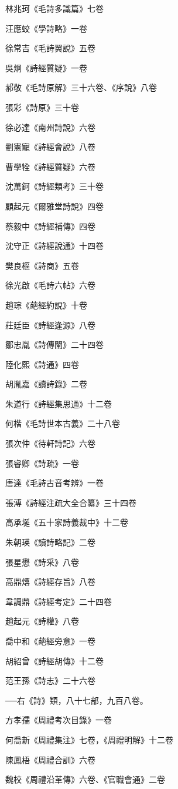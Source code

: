 林兆珂《毛詩多識篇》七卷

汪應蛟《學詩略》一卷

徐常吉《毛詩翼說》五卷

吳炯《詩經質疑》一卷

郝敬《毛詩原解》三十六卷、《序說》八卷

張彩《詩原》三十卷

徐必達《南州詩說》六卷

劉憲寵《詩經會說》八卷

曹學牷《詩經質疑》六卷

沈萬鈳《詩經類考》三十卷

顧起元《爾雅堂詩說》四卷

蔡毅中《詩經補傳》四卷

沈守正《詩經說通》十四卷

樊良樞《詩商》五卷

徐光啟《毛詩六帖》六卷

趙琮《葩經約說》十卷

莊廷臣《詩經逢源》八卷

鄒忠胤《詩傳闡》二十四卷

陸化熙《詩通》四卷

胡胤嘉《讀詩錄》二卷

朱道行《詩經集思通》十二卷

何楷《毛詩世本古義》二十八卷

張次仲《待軒詩記》六卷

張睿卿《詩疏》一卷

唐達《毛詩古音考辨》一卷

張溥《詩經注疏大全合纂》三十四卷

高承埏《五十家詩義裁中》十二卷

朱朝瑛《讀詩略記》二卷

張星懋《詩采》八卷

高鼎熺《詩經存旨》八卷

韋調鼎《詩經考定》二十四卷

趙起元《詩權》八卷

喬中和《葩經旁意》一卷

胡紹曾《詩經胡傳》十二卷

范王孫《詩志》二十六卷

──右《詩》類，八十七部，九百八卷。

方孝孺《周禮考次目錄》一卷

何喬新《周禮集注》七卷，《周禮明解》十二卷

陳鳳梧《周禮合訓》六卷

魏校《周禮沿革傳》六卷、《官職會通》二卷

